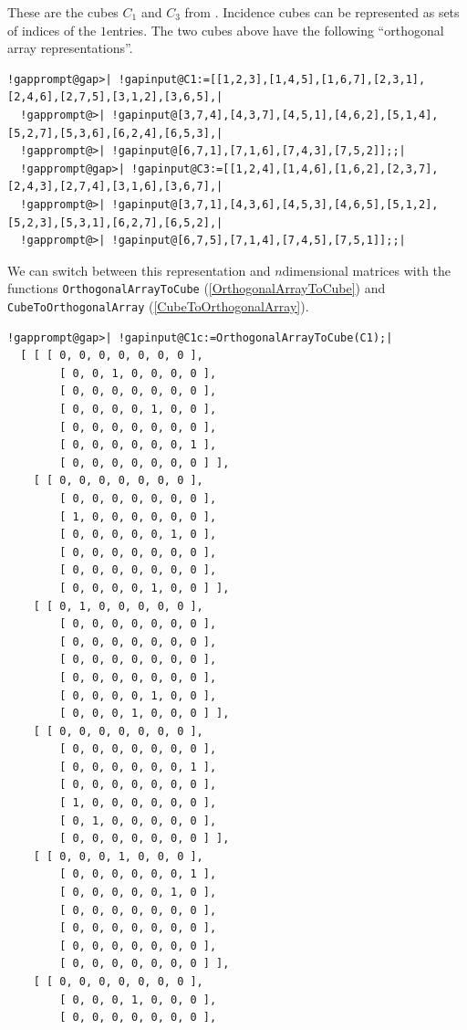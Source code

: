 \documentclass[a4paper,11pt]{report}
\begin{document}
{{ These are the cubes $C_1$ and $C_3$ from \cite{KR24}. Incidence cubes can be represented as sets of indices of the $1$\texttt{}entries. The two cubes above have the following
``orthogonal array representations''. 
\begin{Verbatim}[commandchars=!@|,fontsize=\small,frame=single,label=Example]
  !gapprompt@gap>| !gapinput@C1:=[[1,2,3],[1,4,5],[1,6,7],[2,3,1],[2,4,6],[2,7,5],[3,1,2],[3,6,5],|
  !gapprompt@>| !gapinput@[3,7,4],[4,3,7],[4,5,1],[4,6,2],[5,1,4],[5,2,7],[5,3,6],[6,2,4],[6,5,3],|
  !gapprompt@>| !gapinput@[6,7,1],[7,1,6],[7,4,3],[7,5,2]];;|
  !gapprompt@gap>| !gapinput@C3:=[[1,2,4],[1,4,6],[1,6,2],[2,3,7],[2,4,3],[2,7,4],[3,1,6],[3,6,7],|
  !gapprompt@>| !gapinput@[3,7,1],[4,3,6],[4,5,3],[4,6,5],[5,1,2],[5,2,3],[5,3,1],[6,2,7],[6,5,2],|
  !gapprompt@>| !gapinput@[6,7,5],[7,1,4],[7,4,5],[7,5,1]];;|
\end{Verbatim}
 We can switch between this representation and $n$\texttt{}dimensional matrices with the functions \texttt{OrthogonalArrayToCube} (\ref{OrthogonalArrayToCube}) and \texttt{CubeToOrthogonalArray} (\ref{CubeToOrthogonalArray}). 
\begin{Verbatim}[commandchars=!@|,fontsize=\small,frame=single,label=Example]
  !gapprompt@gap>| !gapinput@C1c:=OrthogonalArrayToCube(C1);|
  [ [ [ 0, 0, 0, 0, 0, 0, 0 ], 
        [ 0, 0, 1, 0, 0, 0, 0 ], 
        [ 0, 0, 0, 0, 0, 0, 0 ], 
        [ 0, 0, 0, 0, 1, 0, 0 ], 
        [ 0, 0, 0, 0, 0, 0, 0 ], 
        [ 0, 0, 0, 0, 0, 0, 1 ], 
        [ 0, 0, 0, 0, 0, 0, 0 ] ], 
    [ [ 0, 0, 0, 0, 0, 0, 0 ], 
        [ 0, 0, 0, 0, 0, 0, 0 ], 
        [ 1, 0, 0, 0, 0, 0, 0 ], 
        [ 0, 0, 0, 0, 0, 1, 0 ], 
        [ 0, 0, 0, 0, 0, 0, 0 ], 
        [ 0, 0, 0, 0, 0, 0, 0 ], 
        [ 0, 0, 0, 0, 1, 0, 0 ] ], 
    [ [ 0, 1, 0, 0, 0, 0, 0 ], 
        [ 0, 0, 0, 0, 0, 0, 0 ], 
        [ 0, 0, 0, 0, 0, 0, 0 ], 
        [ 0, 0, 0, 0, 0, 0, 0 ], 
        [ 0, 0, 0, 0, 0, 0, 0 ], 
        [ 0, 0, 0, 0, 1, 0, 0 ], 
        [ 0, 0, 0, 1, 0, 0, 0 ] ], 
    [ [ 0, 0, 0, 0, 0, 0, 0 ], 
        [ 0, 0, 0, 0, 0, 0, 0 ], 
        [ 0, 0, 0, 0, 0, 0, 1 ], 
        [ 0, 0, 0, 0, 0, 0, 0 ], 
        [ 1, 0, 0, 0, 0, 0, 0 ], 
        [ 0, 1, 0, 0, 0, 0, 0 ], 
        [ 0, 0, 0, 0, 0, 0, 0 ] ], 
    [ [ 0, 0, 0, 1, 0, 0, 0 ], 
        [ 0, 0, 0, 0, 0, 0, 1 ], 
        [ 0, 0, 0, 0, 0, 1, 0 ], 
        [ 0, 0, 0, 0, 0, 0, 0 ], 
        [ 0, 0, 0, 0, 0, 0, 0 ], 
        [ 0, 0, 0, 0, 0, 0, 0 ], 
        [ 0, 0, 0, 0, 0, 0, 0 ] ], 
    [ [ 0, 0, 0, 0, 0, 0, 0 ], 
        [ 0, 0, 0, 1, 0, 0, 0 ], 
        [ 0, 0, 0, 0, 0, 0, 0 ], 

\end{Verbatim}}}
\end{document}
